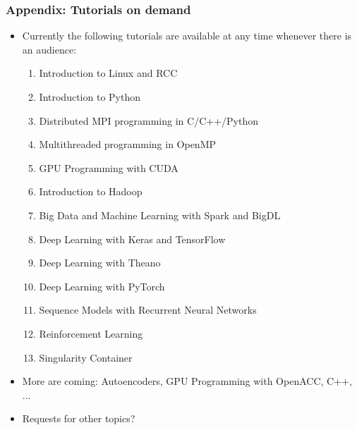 \begin{frame}[fragile]
  \frametitle{Appendix: Tutorials on demand}
  \begin{itemize}
    \item Currently the following tutorials are available at any time whenever there is an audience:
      \begin{enumerate}
        \item Introduction to Linux and RCC
        \item Introduction to Python
        \item Distributed MPI programming in C/C++/Python
        \item Multithreaded programming in OpenMP
        \item GPU Programming with CUDA
        \item Introduction to Hadoop
        \item Big Data and Machine Learning with Spark and BigDL
        \item Deep Learning with Keras and TensorFlow
        \item Deep Learning with Theano
        \item Deep Learning with PyTorch
        \item Sequence Models with Recurrent Neural Networks
        \item Reinforcement Learning
        \item Singularity Container
      \end{enumerate}
    \item More are coming: Autoencoders, GPU Programming with OpenACC, C++, ...
    \item Requests for other topics?
  \end{itemize}
\end{frame}
